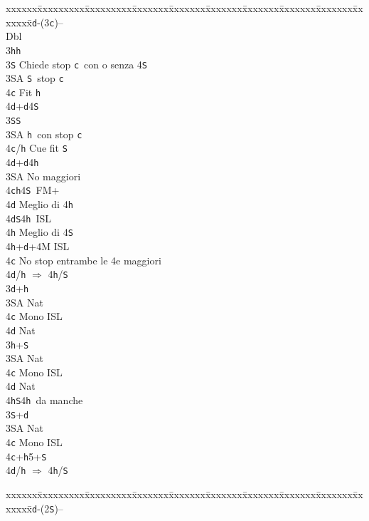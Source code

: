 \documentclass[a4paper,italian]{article}
\newcommand{\BS}{\small{\texttt{S}}}
\newcommand{\BC}{\small{\texttt{c}}}
\newcommand{\BD}{\small{\texttt{d}}}
\newcommand{\BH}{\small{\texttt{h}}}
\newenvironment{bidtable}
{\begin{tabbing}

    xxxxxx\=xxxxxxxxx\=xxxxxxxxx\=xxxxxxx\=xxxxxxx\=xxxxxxx\=xxxxxxx\=xxxxxxx\=xxxxxxx\=xxxxxxx\=\kill}
{\end{tabbing} }%
\begin{document}
\begin{multicols}{2}
    \begin{bidtable}
        2\BD-(3\BC)--\+\\
        Dbl\+\\
        3\BH {}\BH \+\\
        3\BS \> Chiede stop \BC\ con o senza 4\BS \\
        3\small{SA} \BS\ stop \BC\\
        4\BC \> Fit \BH \\
        4\BD {}+\BD 4\BS \-\\
        3\BS {}\BS \+\\
        3\small{SA} \BH\ con stop \BC \\
        4\BC/\BH \> Cue fit \BS \\
        4\BD {}+\BD 4\BH \-\\
        3\small{SA} \> No maggiori\+\\
        4\BC {}\BH 4\BS\ FM+\+\\
        4\BD \> Meglio di 4\BH \-\\
        4\BD {}\BS 4\BH\ ISL\+\\
        4\BH \> Meglio di 4\BS \-\\
        4\BH {}+\BD +4M ISL\-\\
        4\BC\> No stop entrambe le 4e maggiori\+\\
        4\BD/\BH\> $\Rightarrow$ 4\BH/\BS\-\\
        3\BD {}+\BH \+\\
        3\small{SA} \> Nat\+\\
        4\BC \> Mono ISL\\
        4\BD \> Nat\-\-\\
        3\BH {}+\BS \+\\
        3\small{SA} \> Nat\+\\
        4\BC \> Mono ISL\\
        4\BD \> Nat\\
        4\BH {}\BS 4\BH\ da manche\-\-\\
        3\BS {}+\BD \+\\
        3\small{SA} \> Nat\+\\
        4\BC \> Mono ISL\-\-\\
        4\BC {}+\BH5+\BS\\
        4\BD/\BH \> $\Rightarrow$ 4\BH /\BS \-
    \end{bidtable}
    \begin{bidtable}
        2\BD-(2\BS)--\+\\

\end{bidtable}
\end{multicols}
\end{document}
